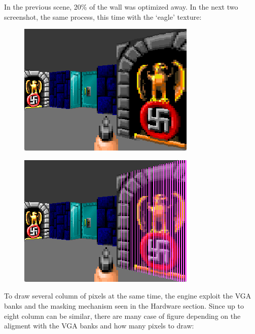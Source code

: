 In the previous scene, 20\% of the wall was optimized away. In the next two screenshot, the same process, this time with the `eagle' texture:
\begin{figure}[H]
 \centering
 \includegraphics[width=\textwidth]{screenshots/post_optimization_2_show.png}
\end{figure}


\begin{figure}[H]
 \centering
 \includegraphics[width=\textwidth]{screenshots/post_optimization_2_pink_show.png}
\end{figure}
 
To draw several column of pixels at the same time, the engine exploit the VGA banks and the masking mechanism seen in the Hardware section.
Since up to eight column can be similar, there are many case of figure depending on the aligment with the VGA banks and how many pixels to draw:

